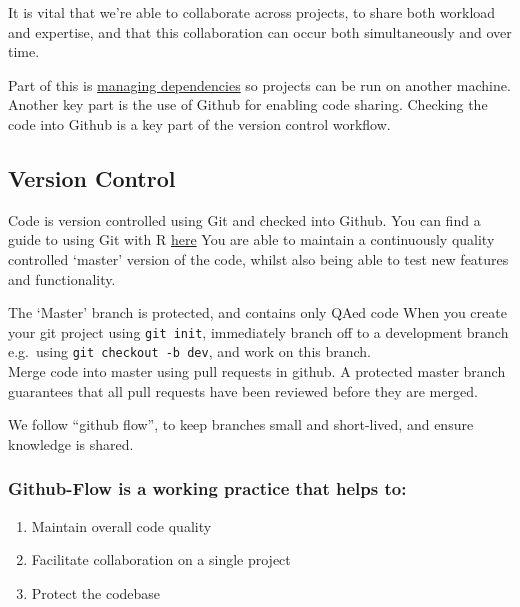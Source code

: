 \documentclass[]{book}
\providecommand{\tightlist}{%
  \setlength{\itemsep}{0pt}\setlength{\parskip}{0pt}}
\begin{document}
It is vital that we're able to collaborate across projects, to share both workload and expertise, and that this collaboration can occur both simultaneously and over time.

Part of this is \protect\hyperlink{projdep}{managing dependencies} so projects can be run on another machine. Another key part is the use of Github for enabling code sharing. Checking the code into Github is a key part of the version control workflow.

\hypertarget{versioncontrol}{%
\subsection{Version Control}\label{versioncontrol}}

Code is version controlled using Git and checked into Github.
You can find a guide to using Git with R \href{http://happygitwithr.com/}{here}
You are able to maintain a continuously quality controlled `master' version of the code, whilst also being able to test new features and functionality.

The `Master' branch is protected, and contains only QAed code
When you create your git project using \texttt{git\ init}, immediately branch off to a development branch e.g.~using \texttt{git\ checkout\ -b\ dev}, and work on this branch.\\
Merge code into master using pull requests in github. A protected master branch guarantees that all pull requests have been reviewed before they are merged.

We follow ``github flow'', to keep branches small and short-lived, and ensure knowledge is shared.

\hypertarget{github-flow-is-a-working-practice-that-helps-to}{%
\subsubsection*{Github-Flow is a working practice that helps to:}\label{github-flow-is-a-working-practice-that-helps-to}}

\begin{enumerate}
\def\labelenumi{\arabic{enumi}.}
\tightlist
\item
  Maintain overall code quality\\
\item
  Facilitate collaboration on a single project\\
\item
  Protect the codebase
\end{enumerate}
\end{document}
